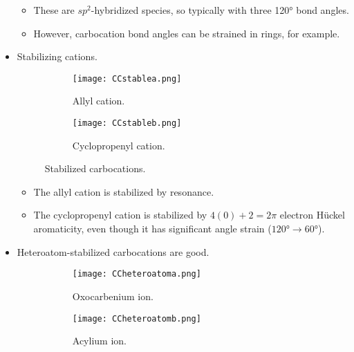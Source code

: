 \documentclass[../notes.tex]{subfiles}
\begin{document}
\begin{itemize}
    \begin{itemize}
        \item These are $sp^2$-hybridized species, so typically with three \ang{120} bond angles.
        \item However, carbocation bond angles can be strained in rings, for example.
    \end{itemize}
    \item Stabilizing cations.
    \begin{figure}[h!]
        \centering
        \begin{subfigure}[b]{0.3\linewidth}
            \centering
            \texttt{[image: CCstablea.png]}
            \caption{Allyl cation.}
            \label{fig:CCstablea}
        \end{subfigure}
        \begin{subfigure}[b]{0.3\linewidth}
            \centering
            \texttt{[image: CCstableb.png]}
            \caption{Cyclopropenyl cation.}
            \label{fig:CCstableb}
        \end{subfigure}
        \caption{Stabilized carbocations.}
        \label{fig:CCstable}
    \end{figure}
    \begin{itemize}
        \item The allyl cation is stabilized by resonance.
        \item The cyclopropenyl cation is stabilized by $4(0)+2=2\pi$ electron H\"{u}ckel aromaticity, even though it has significant angle strain ($\ang{120}\to\ang{60}$).
    \end{itemize}
    \item Heteroatom-stabilized carbocations are good.
    \begin{figure}[h!]
        \centering
        \begin{subfigure}[b]{0.33\linewidth}
            \centering
            \texttt{[image: CCheteroatoma.png]}
            \caption{Oxocarbenium ion.}
            \label{fig:CCheteroatoma}
        \end{subfigure}
        \begin{subfigure}[b]{0.32\linewidth}
            \centering
            \texttt{[image: CCheteroatomb.png]}
            \caption{Acylium ion.}
            \label{fig:CCheteroatomb}
        \end{subfigure}
        \begin{subfigure}[b]{0.33\linewidth}

\end{subfigure}
\end{figure}
\end{itemize}
\end{document}

